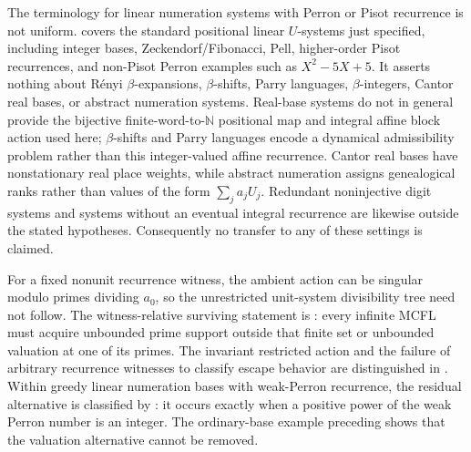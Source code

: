 \begin{remark}
  \label{rem:pisot-open-interfaces}
  The terminology for linear numeration systems with Perron or Pisot
  recurrence is not uniform.
   covers the standard
  positional linear \(U\)-systems just specified, including integer
  bases, Zeckendorf/Fibonacci, Pell, higher-order Pisot recurrences, and
  non-Pisot Perron examples such as \(X^2-5X+5\).
  It asserts nothing about R\'enyi \(\beta\)-expansions, \(\beta\)-shifts,
  Parry languages, \(\beta\)-integers, Cantor real bases, or abstract
  numeration systems. Real-base systems do not in general provide the
  bijective finite-word-to-\(\mathbb N\) positional map and integral affine
  block action used here; \(\beta\)-shifts and Parry languages encode a
  dynamical admissibility problem rather than this integer-valued affine
  recurrence. Cantor real bases have nonstationary real place weights, while
  abstract numeration assigns genealogical ranks rather than values of the
  form \(\sum_j a_jU_j\). Redundant noninjective digit systems and systems
  without an eventual integral recurrence are likewise outside the stated
  hypotheses. Consequently no transfer to any of these settings is claimed.

  For a fixed nonunit recurrence witness, the ambient action can be
  singular modulo primes dividing \(a_0\), so the unrestricted unit-system
  divisibility tree need not follow. The witness-relative surviving
  statement is : every infinite
  MCFL must acquire unbounded prime support outside that finite set or
  unbounded valuation at one of its primes. The invariant restricted
  action and the failure of arbitrary recurrence witnesses to classify
  escape behavior are distinguished in
  .
  Within greedy linear numeration bases with weak-Perron recurrence, the
  residual alternative is classified by
  : it occurs exactly
  when a positive power of the weak Perron number is an integer. The
  ordinary-base example preceding
   shows that the valuation
  alternative cannot be removed.
\end{remark}
